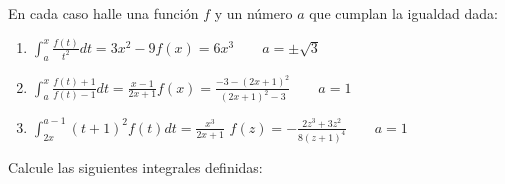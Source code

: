 \begin{ejer}{En cada caso halle una función $f$ y un número $a$ que cumplan la igualdad dada:}
\end{ejer}
%
\begin{enumerate}

\item {$\displaystyle\int_{a}^{x}\frac{f\left( t\right) }{t^{2}}dt=3x^{2}-9$}{$f(x)=6x^{3}\qquad a=\pm \sqrt{3}$}

\item {$\displaystyle\int_{a}^{x}\frac{f(t)+1}{f(t)-1}dt=\frac{x-1}{2x+1}$}{$f\left( x\right) =\frac{-3-\left( 2x+1\right) ^{2}}{\left( 2x+1\right)
^{2}-3}\qquad a=1$}


\item {$\displaystyle\int_{2x}^{a-1}\left( t+1\right) ^{2}f(t)dt=\frac{x^{3}}{2x+1}$
}{$f(z)=-\frac{2z^{3}+3z^{2}}{8(z+1)^{4}}\qquad a=1$}

\end{enumerate}




\begin{ejer}{Calcule las siguientes integrales definidas:}
\end{ejer}
%

